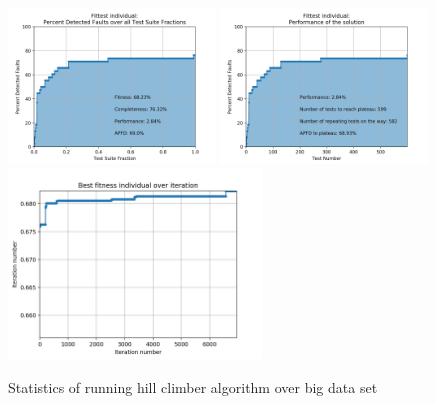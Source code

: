 \documentclass[12pt]{article}
\begin{document}
\begin{figure}[H]
  \centering
  \includegraphics[width=0.49\textwidth]{hill_climber_big_apfd_total}
  \includegraphics[width=0.49\textwidth]{hill_climber_big_apfd_local}
  \includegraphics[width=0.6\textwidth]{hill_climber_big_fitness_all}
  \caption{Statistics of running hill climber algorithm over big data set}
  \label{fig:hill_climber_big}
\end{figure}
\end{document}
